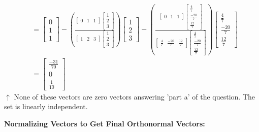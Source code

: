 \documentclass{article}
\begin{document}
\begin{align}
        &= \begin{bmatrix} 0 \\ 1 \\ 1 \end{bmatrix} - \left( \frac{\begin{bmatrix} 0 & 1 & 1 \end{bmatrix}\begin{bmatrix} 1 \\ 2 \\ 3 \end{bmatrix}}{\begin{bmatrix} 1 & 2 & 3 \end{bmatrix}\begin{bmatrix} 1 \\ 2 \\ 3 \end{bmatrix}} \right)\begin{bmatrix} 1 \\ 2 \\ 3 \end{bmatrix} - \left( \frac{\begin{bmatrix} 0 & 1 & 1 \end{bmatrix}\begin{bmatrix} \frac{4}{7} \\ \frac{-20}{7} \\ \frac{12}{7} \end{bmatrix}}{\begin{bmatrix} \frac{4}{7} & \frac{-20}{7} & \frac{12}{7} \end{bmatrix}\begin{bmatrix} \frac{4}{7} \\ \frac{-20}{7} \\ \frac{12}{7} \end{bmatrix}} \right)\begin{bmatrix} \frac{4}{7} \\ \frac{-20}{7} \\ \frac{12}{7} \end{bmatrix} \\
        &= \begin{bmatrix} \frac{-31}{70} \\ 0 \\ \frac{1}{10} \end{bmatrix}
\end{align}
$\uparrow$ None of these vectors are zero vectors answering 'part a' of the question. The set is linearly independent.

\textbf{Normalizing Vectors to Get Final Orthonormal Vectors:}
\end{document}
